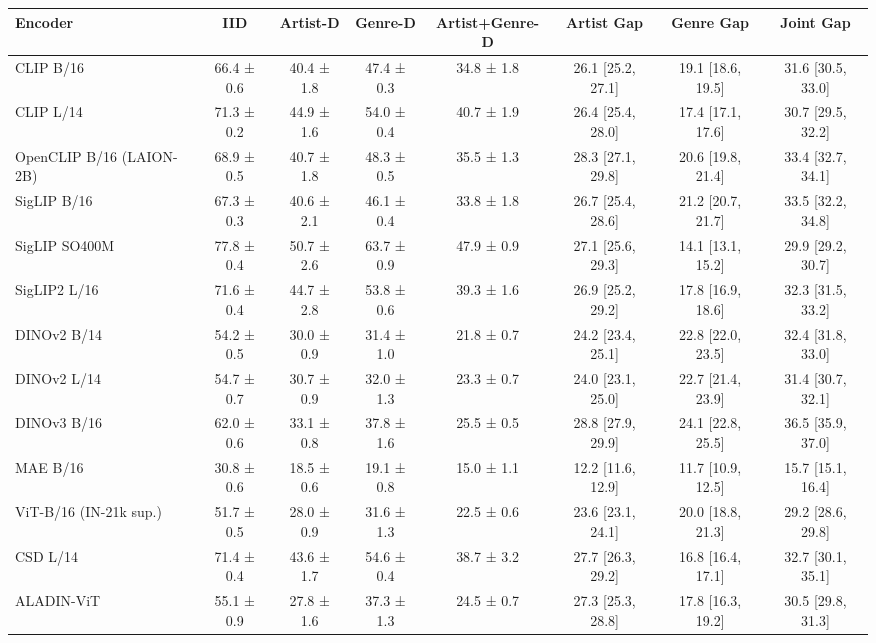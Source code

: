 \begin{tabular}{lccccccc}
\toprule
Encoder & IID & Artist-D & Genre-D & Artist+Genre-D & Artist Gap & Genre Gap & Joint Gap \\
\midrule
CLIP B/16 & 66.4 ± 0.6 & 40.4 ± 1.8 & 47.4 ± 0.3 & 34.8 ± 1.8 & 26.1 [25.2, 27.1] & 19.1 [18.6, 19.5] & 31.6 [30.5, 33.0] \\
CLIP L/14 & 71.3 ± 0.2 & 44.9 ± 1.6 & 54.0 ± 0.4 & 40.7 ± 1.9 & 26.4 [25.4, 28.0] & 17.4 [17.1, 17.6] & 30.7 [29.5, 32.2] \\
OpenCLIP B/16 (LAION-2B) & 68.9 ± 0.5 & 40.7 ± 1.8 & 48.3 ± 0.5 & 35.5 ± 1.3 & 28.3 [27.1, 29.8] & 20.6 [19.8, 21.4] & 33.4 [32.7, 34.1] \\
SigLIP B/16 & 67.3 ± 0.3 & 40.6 ± 2.1 & 46.1 ± 0.4 & 33.8 ± 1.8 & 26.7 [25.4, 28.6] & 21.2 [20.7, 21.7] & 33.5 [32.2, 34.8] \\
SigLIP SO400M & 77.8 ± 0.4 & 50.7 ± 2.6 & 63.7 ± 0.9 & 47.9 ± 0.9 & 27.1 [25.6, 29.3] & 14.1 [13.1, 15.2] & 29.9 [29.2, 30.7] \\
SigLIP2 L/16 & 71.6 ± 0.4 & 44.7 ± 2.8 & 53.8 ± 0.6 & 39.3 ± 1.6 & 26.9 [25.2, 29.2] & 17.8 [16.9, 18.6] & 32.3 [31.5, 33.2] \\
DINOv2 B/14 & 54.2 ± 0.5 & 30.0 ± 0.9 & 31.4 ± 1.0 & 21.8 ± 0.7 & 24.2 [23.4, 25.1] & 22.8 [22.0, 23.5] & 32.4 [31.8, 33.0] \\
DINOv2 L/14 & 54.7 ± 0.7 & 30.7 ± 0.9 & 32.0 ± 1.3 & 23.3 ± 0.7 & 24.0 [23.1, 25.0] & 22.7 [21.4, 23.9] & 31.4 [30.7, 32.1] \\
DINOv3 B/16 & 62.0 ± 0.6 & 33.1 ± 0.8 & 37.8 ± 1.6 & 25.5 ± 0.5 & 28.8 [27.9, 29.9] & 24.1 [22.8, 25.5] & 36.5 [35.9, 37.0] \\
MAE B/16 & 30.8 ± 0.6 & 18.5 ± 0.6 & 19.1 ± 0.8 & 15.0 ± 1.1 & 12.2 [11.6, 12.9] & 11.7 [10.9, 12.5] & 15.7 [15.1, 16.4] \\
ViT-B/16 (IN-21k sup.) & 51.7 ± 0.5 & 28.0 ± 0.9 & 31.6 ± 1.3 & 22.5 ± 0.6 & 23.6 [23.1, 24.1] & 20.0 [18.8, 21.3] & 29.2 [28.6, 29.8] \\
CSD L/14 & 71.4 ± 0.4 & 43.6 ± 1.7 & 54.6 ± 0.4 & 38.7 ± 3.2 & 27.7 [26.3, 29.2] & 16.8 [16.4, 17.1] & 32.7 [30.1, 35.1] \\
ALADIN-ViT & 55.1 ± 0.9 & 27.8 ± 1.6 & 37.3 ± 1.3 & 24.5 ± 0.7 & 27.3 [25.3, 28.8] & 17.8 [16.3, 19.2] & 30.5 [29.8, 31.3] \\
\bottomrule
\end{tabular}
